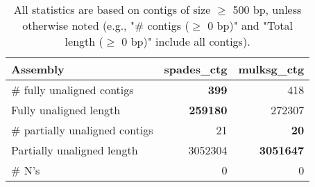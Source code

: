\documentclass[12pt,a4paper]{article}
\begin{document}
\begin{table}[ht]
\begin{center}
\caption{All statistics are based on contigs of size $\geq$ 500 bp, unless otherwise noted (e.g., "\# contigs ($\geq$ 0 bp)" and "Total length ($\geq$ 0 bp)" include all contigs).}
\begin{tabular}{|l*{2}{|r}|}
\hline
Assembly & spades\_ctg & mulksg\_ctg \\ \hline
\# fully unaligned contigs & {\bf 399} & 418 \\ \hline
Fully unaligned length & {\bf 259180} & 272307 \\ \hline
\# partially unaligned contigs & 21 & {\bf 20} \\ \hline
Partially unaligned length & 3052304 & {\bf 3051647} \\ \hline
\# N's & 0 & 0 \\ \hline
\end{tabular}
\end{center}
\end{table}
\end{document}
